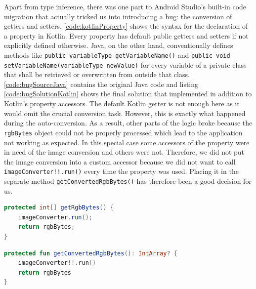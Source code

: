 \documentclass[
			   fontsize=11pt,
               paper=a4,
               bibliography=totoc,
               idxtotoc,
               headsepline,
               footsepline,
               footinclude=false,
               BCOR=12mm,
               DIV=13,
               openany,   %
               ]
               {scrbook}
\newcommand{\code}[1]{\lstinline[basicstyle = \ttfamily\small]{#1}} %
\begin{document}
Apart from type inference, there was one part to Android Studio's built-in code migration that actually tricked us into introducing a bug: the conversion of getters and setters. \autoref{code:kotlinProperty} shows the syntax for the declaration of a property in Kotlin. Every property has default public getters and setters if not explicitly defined otherwise. Java, on the other hand, conventionally defines methods like \code{public variableType getVariableName()} and \code{public void setVariableName(variableType newValue)} for every variable of a private class that shall be retrieved or overwritten from outside that class. \\

\autoref{code:bugSourceJava} contains the original Java code and listing \autoref{code:bugSolutionKotlin} shows the final solution that implemented in addition to Kotlin's property accessors. The default Kotlin getter is not enough here as it would omit the crucial conversion task. However, this is exactly what happened during the auto-conversion. As a result, other parts of the logic broke because the \code{rgbBytes} object could not be properly processed which lead to the application not working as expected. In this special case some accessors of the property were in need of the image conversion and others were not. Therefore, we did not put the image conversion into a custom accessor because we did not want to call \code{imageConverter!!.run()} every time the property was used. Placing it in the separate method \code{getConvertedRgbBytes()} has therefore been a good decision for us.

\begin{minipage}[t]{0.41\linewidth}
	\begin{lstlisting}[style=standard, language=Java, label=code:bugSourceJava, caption={Java code that lead to the introduction of a bug after using Android Studio's built-in Java to Kotlin converter.}]
protected int[] getRgbBytes() {
	imageConverter.run();
	return rgbBytes;
}
	\end{lstlisting}
\end{minipage}
	\hfill
\begin{minipage}[t]{0.48\linewidth}
	\begin{lstlisting}[style=standard, language=Kotlin, label=code:bugSolutionKotlin, caption={Substituting the wrongly placed default Kotlin accessors with this method solved the problem.}]
protected fun getConvertedRgbBytes(): IntArray? {
	imageConverter!!.run()
	return rgbBytes
}
	\end{lstlisting}
\end{minipage}
\end{document}
